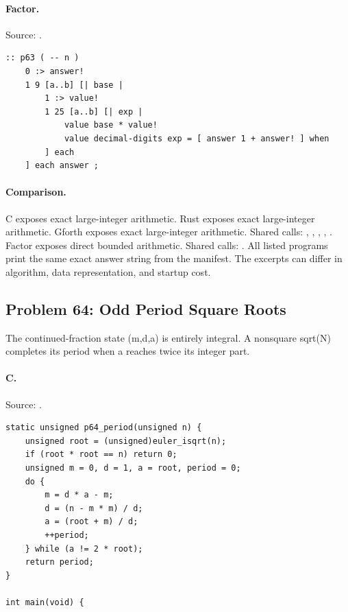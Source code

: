 \paragraph{Factor.} Source: .
\begin{lstlisting}
:: p63 ( -- n )
    0 :> answer!
    1 9 [a..b] [| base |
        1 :> value!
        1 25 [a..b] [| exp |
            value base * value!
            value decimal-digits exp = [ answer 1 + answer! ] when
        ] each
    ] each answer ;
\end{lstlisting}

\paragraph{Comparison.}
C exposes exact large-integer arithmetic. Rust exposes exact large-integer arithmetic. Gforth exposes exact large-integer arithmetic. Shared calls: \texttt{}, \texttt{}, \texttt{}, \texttt{}, \texttt{}. Factor exposes direct bounded arithmetic. Shared calls: \texttt{}.
All listed programs print the same exact answer string from the manifest. The excerpts can differ in algorithm, data representation, and startup cost.

\subsection{Problem 64: Odd Period Square Roots}
\label{walkthrough:p64}
The continued-fraction state (m,d,a) is entirely integral. A nonsquare sqrt(N) completes its period when a reaches twice its integer part.

\paragraph{C.} Source: .
\begin{lstlisting}
static unsigned p64_period(unsigned n) {
    unsigned root = (unsigned)euler_isqrt(n);
    if (root * root == n) return 0;
    unsigned m = 0, d = 1, a = root, period = 0;
    do {
        m = d * a - m;
        d = (n - m * m) / d;
        a = (root + m) / d;
        ++period;
    } while (a != 2 * root);
    return period;
}

int main(void) {
\end{lstlisting}

